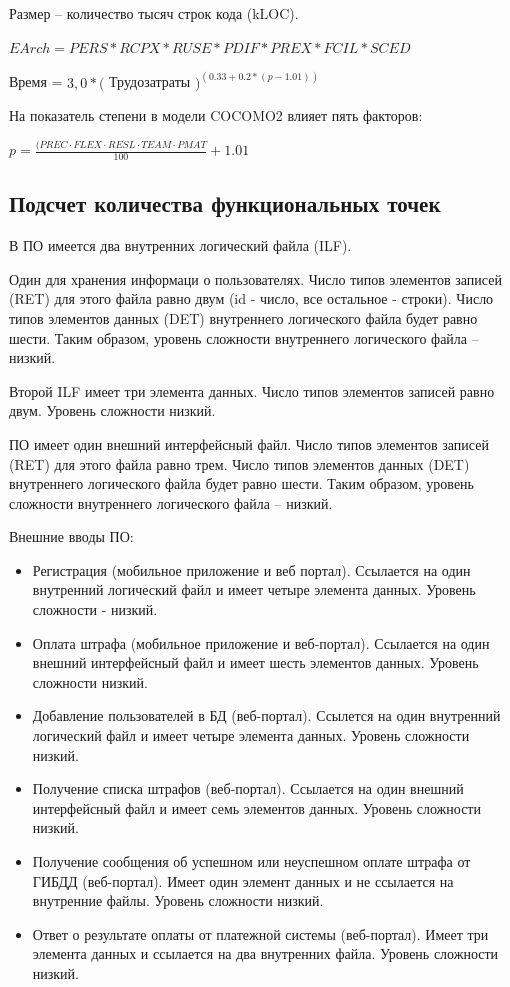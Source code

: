 \documentclass[a4paper,14pt]{article}
\begin{document}
Размер -- количество тысяч строк кода (kLOC).

$EArch= PERS * RCPX * RUSE * PDIF * PREX * FCIL * SCED$

Время = $3,0 * ($ Трудозатраты $)^{(0.33 + 0.2 * (p-1.01))}$

На показатель степени в модели COCOMO2 влияет пять факторов: 

$p = \frac{(PREC \cdot FLEX \cdot RESL \cdot TEAM \cdot PMAT}{100} + 1.01$

\subsection*{Подсчет количества функциональных точек}

В  ПО имеется  два  внутренних  логический  файла  (ILF). 

Один для хранения  информаци о пользователях. Число типов элементов записей (RET) для этого файла равно двум (id - число, все остальное - строки). Число  типов  элементов  данных  (DET)  внутреннего  логического файла  будет  равно шести. Таким  образом,  уровень  сложности  внутреннего логического файла – низкий.

Второй ILF имеет три элемента данных. Число типов элементов записей равно двум. Уровень сложности низкий.

ПО имеет один внешний интерфейсный файл. Число типов элементов записей (RET) для этого файла равно трем. Число  типов  элементов  данных  (DET)  внутреннего  логического файла  будет  равно шести. Таким  образом,  уровень  сложности  внутреннего логического файла – низкий.

Внешние вводы ПО:

\begin{itemize}
    \item Регистрация (мобильное приложение и веб портал). Ссылается на один внутренний логический файл и имеет четыре элемента данных. Уровень сложности - низкий.
    \item Оплата штрафа (мобильное приложение и веб-портал). Ссылается на один внешний интерфейсный файл и имеет шесть элементов данных. Уровень сложности низкий.
    \item Добавление пользователей в БД (веб-портал). Ссылется на один внутренний логический файл и имеет четыре элемента данных. Уровень сложности низкий.
    \item Получение списка штрафов (веб-портал). Ссылается на один внешний интерфейсный файл и имеет семь элементов данных. Уровень сложности низкий.
    \item Получение сообщения об успешном или неуспешном оплате штрафа от ГИБДД (веб-портал). Имеет один элемент данных и не ссылается на внутренние файлы. Уровень сложности низкий.
    \item Ответ о результате оплаты от платежной системы (веб-портал). Имеет три элемента данных и ссылается на два внутренних файла. Уровень сложности низкий.
\end{itemize}
\end{document}
